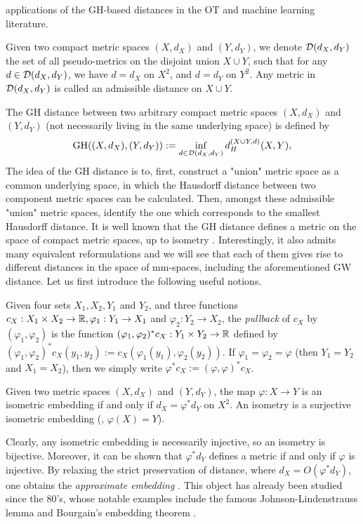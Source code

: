 applications of the GH-based distances in the OT and machine learning literature.
\begin{definition}
  Given two compact metric spaces $(X,d_X)$ and $(Y,d_Y)$, we denote $\mathcal D(d_X,d_Y)$
  the set of all pseudo-metrics on the disjoint union $X \cup Y$, such that for any
  $d \in \mathcal D(d_X,d_Y)$, we have $d = d_X$ on $X^2$, and $d = d_Y$ on $Y^2$.
  Any metric in $\mathcal D(d_X,d_Y)$ is called an admissible distance on $X \cup Y$.
\end{definition}
The GH distance between two arbitrary compact metric spaces $(X,d_X)$ and $(Y,d_Y)$
(not necessarily living in the same underlying space) is defined by
\begin{align}
  \label{GH:zeroth}
  \text{GH}((X,d_X), (Y,d_Y)) := \inf_{d \in \mathcal D(d_X,d_Y)} d_{H}^{(X \cup Y, d)}(X, Y),
\end{align}
The idea of the GH distance is to, first, construct a "union" metric space as a common underlying space,
in which the Hausdorff distance between two component metric spaces can be calculated. Then,
amongst these admissible "union" metric spaces, identify the one which
corresponds to the smallest Hausdorff distance.
It is well known that the GH distance defines a metric on the space of compact metric spaces,
up to isometry \citep{Gromov99,Burago01}. Interestingly, it also admits many
equivalent reformulations and we will see that each of them gives rise to different
distances in the space of mm-spaces, including the aforementioned GW distance.
Let us first introduce the following useful notions.
\begin{definition}[Pullback]
  \label{def:pullback}
  Given four sets $X_1, X_2, Y_1$ and $Y_2$,
  and three functions $c_X: X_1 \times X_2 \to \mathbb R, \varphi_1: Y_1 \to X_1$ and
  $\varphi_2: Y_2 \to X_2$, the \textit{pullback} of $c_X$ by $(\varphi_1, \varphi_2)$
  is the function $(\varphi_1, \varphi_2)^* c_X: Y_1 \times Y_2 \to \mathbb R$ defined by
  $(\varphi_1, \varphi_2)^*c_X (y_1,y_2) := c_X(\varphi_1(y_1), \varphi_2(y_2))$.
  If $\varphi_1 = \varphi_2 = \varphi$ (then $Y_1 = Y_2$ and $X_1 = X_2$),
  then we simply write $\varphi^*c_X := (\varphi, \varphi)^*c_X$.
\end{definition}
\begin{definition}
  Given two metric spaces $(X,d_X)$ and $(Y,d_Y)$,
  the map $\varphi: X \to Y$ is an isometric embedding if and only if $d_X = \varphi^* d_Y$ on $X^2$.
  An isometry is a surjective isometric embedding (\ie, $\varphi(X) = Y$).
\end{definition}
Clearly, any isometric embedding is necessarily injective, so an isometry is bijective.
Moreover, it can be shown that $\varphi^* d_Y$ defines a metric if and
only if $\varphi$ is injective. By relaxing the strict preservation of distance,
where $d_X = O(\varphi^* d_Y)$, one obtains the \textit{approximate embedding} \citep{Matousek13}.
This object has already been studied since the 80's, whose notable examples include the famous
Johnson-Lindenstrauss lemma \citep{Johnson84} and Bourgain's embedding theorem \citep{Bourgain85}.


